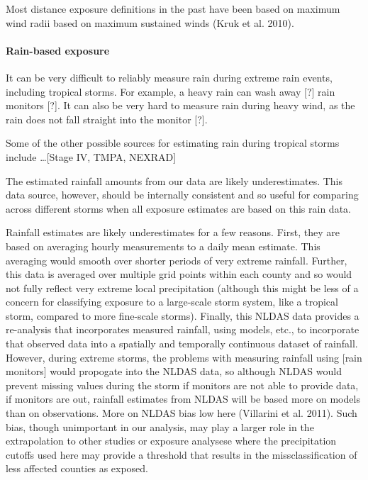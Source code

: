 \documentclass[]{elsarticle} %
\begin{document}
Most distance exposure definitions in the past have been based on
maximum wind radii based on maximum sustained winds (Kruk et al. 2010).

\paragraph{Rain-based exposure}\label{rain-based-exposure-1}

It can be very difficult to reliably measure rain during extreme rain
events, including tropical storms. For example, a heavy rain can wash
away {[}?{]} rain monitors {[}?{]}. It can also be very hard to measure
rain during heavy wind, as the rain does not fall straight into the
monitor {[}?{]}.

Some of the other possible sources for estimating rain during tropical
storms include \ldots{}{[}Stage IV, TMPA, NEXRAD{]}

The estimated rainfall amounts from our data are likely underestimates.
This data source, however, should be internally consistent and so useful
for comparing across different storms when all exposure estimates are
based on this rain data.

Rainfall estimates are likely underestimates for a few reasons. First,
they are based on averaging hourly measurements to a daily mean
estimate. This averaging would smooth over shorter periods of very
extreme rainfall. Further, this data is averaged over multiple grid
points within each county and so would not fully reflect very extreme
local precipitation (although this might be less of a concern for
classifying exposure to a large-scale storm system, like a tropical
storm, compared to more fine-scale storms). Finally, this NLDAS data
provides a re-analysis that incorporates measured rainfall, using
models, etc., to incorporate that observed data into a spatially and
temporally continuous dataset of rainfall. However, during extreme
storms, the problems with measuring rainfall using {[}rain monitors{]}
would propogate into the NLDAS data, so although NLDAS would prevent
missing values during the storm if monitors are not able to provide
data, if monitors are out, rainfall estimates from NLDAS will be based
more on models than on observations. More on NLDAS bias low here
(Villarini et al. 2011). Such bias, though unimportant in our analysis,
may play a larger role in the extrapolation to other studies or exposure
analysese where the precipitation cutoffs used here may provide a
threshold that results in the missclassification of less affected
counties as exposed.
\end{document}
